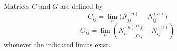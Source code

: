 Matrices $C$ and $G$ are defined by
$$C_{ij} = \lim_n \big(N_{jj}^{(n)} - N_{ij}^{(n)}\big)$$
$$G_{ij} = \lim_n \left( N_{ii}^{(n)} \frac{\alpha_j}{\alpha_i} - N_{ij}^{(n)} \right)$$
whenever the indicated limits exist.
